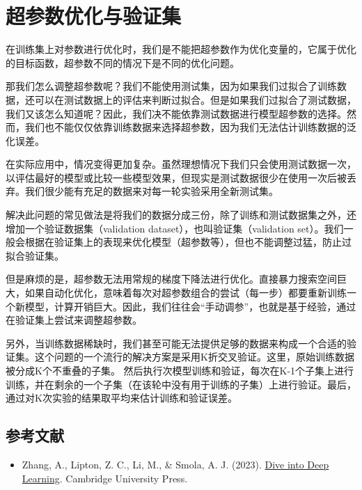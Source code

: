 \setcounter{section}{1}

\hypertarget{ux8d85ux53c2ux6570ux4f18ux5316ux4e0eux9a8cux8bc1ux96c6}{%
\section{超参数优化与验证集}\label{ux8d85ux53c2ux6570ux4f18ux5316ux4e0eux9a8cux8bc1ux96c6}}

在训练集上对参数进行优化时，我们是不能把超参数作为优化变量的，它属于优化的目标函数，超参数不同的情况下是不同的优化问题。

那我们怎么调整超参数呢？我们不能使用测试集，因为如果我们过拟合了训练数据，还可以在测试数据上的评估来判断过拟合。但是如果我们过拟合了测试数据，我们又该怎么知道呢？因此，我们决不能依靠测试数据进行模型超参数的选择。然而，我们也不能仅仅依靠训练数据来选择超参数，因为我们无法估计训练数据的泛化误差。

在实际应用中，情况变得更加复杂。虽然理想情况下我们只会使用测试数据一次，以评估最好的模型或比较一些模型效果，但现实是测试数据很少在使用一次后被丢弃。我们很少能有充足的数据来对每一轮实验采用全新测试集。

解决此问题的常见做法是将我们的数据分成三份，除了训练和测试数据集之外，还增加一个验证数据集（validation dataset），也叫验证集（validation set）。我们一般会根据在验证集上的表现来优化模型（超参数等），但也不能调整过猛，防止过拟合验证集。

但是麻烦的是，超参数无法用常规的梯度下降法进行优化。直接暴力搜索空间巨大，如果自动化优化，意味着每次对超参数组合的尝试（每一步）都要重新训练一个新模型，计算开销巨大。因此，我们往往会``手动调参''，也就是基于经验，通过在验证集上尝试来调整超参数。

另外，当训练数据稀缺时，我们甚至可能无法提供足够的数据来构成一个合适的验证集。这个问题的一个流行的解决方案是采用K折交叉验证。这里，原始训练数据被分成K个不重叠的子集。 然后执行次模型训练和验证，每次在K-1个子集上进行训练，并在剩余的一个子集（在该轮中没有用于训练的子集）上进行验证。最后，通过对K次实验的结果取平均来估计训练和验证误差。

\FloatBarrier
{}
\hypertarget{ux53c2ux8003ux6587ux732e-7}{%
\subsection{参考文献}\label{ux53c2ux8003ux6587ux732e-7}}

\vspace{0.25em}
\begin{itemize}
\tightlist
\item
  Zhang, A., Lipton, Z. C., Li, M., \& Smola, A. J. (2023). \href{https://D2L.ai}{Dive into Deep Learning}. Cambridge University Press.
\end{itemize}

\clearpage
